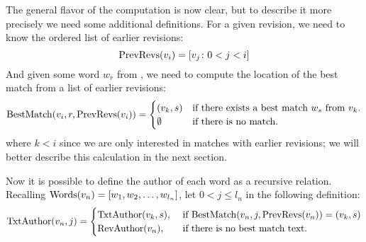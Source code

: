The general flavor of the computation is now clear, but to describe it
more precisely we need some additional definitions.
For a given revision, we need to know the ordered list of earlier
revisions:
\begin{equation*}
    \mathrm{PrevRevs}(v_{i}) = \left[ v_{j} \colon  0 < j < i \right]
\end{equation*}
And given some word $w_r$ from , we need to compute the
location of the best match from a list of earlier revisions:
\begin{equation*}
    \mathrm{BestMatch}(v_{i}, r, \mathrm{PrevRevs}(v_{i})) =
    \begin{cases}
	(v_{k}, s) & \text{if there exists a best match $w_s$ from \ensuremath{v_{k}}.} \\
	\emptyset & \text{if there is no match.} \\
    \end{cases}
\end{equation*}
where $k < i$ since we are only interested in matches with earlier revisions;
we will better describe this calculation in the next section.

Now it is possible to define the author of each word as a recursive relation.
Recalling $\mathrm{Words}(v_{n}) = \left[ w_1, w_2, \ldots, w_{l_n} \right]$, let $0 < j \le l_n$ in the following definition:
\begin{equation*}
\mathrm{TxtAuthor}(v_{n}, j) =
    \begin{cases}
	\mathrm{TxtAuthor}(v_{k}, s), & \text{ if }
	\mathrm{BestMatch}(v_{n}, j, \mathrm{PrevRevs}(v_{n})) = (v_{k}, s) \\
	\mathrm{RevAuthor}(v_{n}), & \text{ if there is no best match text. } \\
    \end{cases}
\end{equation*}

